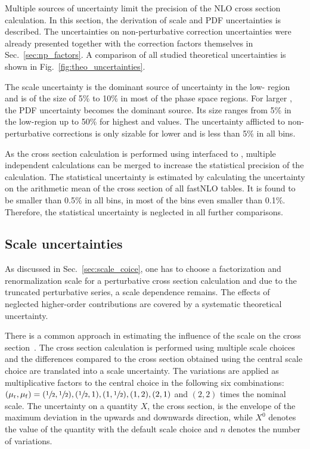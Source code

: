 Multiple sources of uncertainty limit the precision of the NLO cross section
calculation. In this section, the derivation of scale and PDF
uncertainties is described. The uncertainties
on non-perturbative correction uncertainties were already presented together
with the correction factors themselves in Sec.~\ref{sec:np_factors}. A
comparison of all studied theoretical uncertainties is shown in
Fig.~\ref{fig:theo_uncertainties}.

The scale uncertainty is the dominant source of uncertainty in the low-\pt
region and is of the size of 5\% to 10\% in most of the phase space regions. For
larger \ptavg, the PDF uncertainty becomes the dominant source. Its size ranges
from 5\% in the low-\ptavg region up to 50\% for highest \ptavg and \yboost
values. The uncertainty afflicted to non-perturbative corrections is only
sizable for lower \pt and is less than 5\% in all bins.

As the cross section calculation is performed using \fastNLO interfaced to
\NLOJETPP, multiple independent calculations can be merged to increase the
statistical precision of the calculation. The statistical uncertainty is
estimated by calculating the uncertainty on the arithmetic mean of the cross
section of all fastNLO tables. It is found to be smaller than 0.5\% in all bins,
in most of the bins even smaller than 0.1\%. Therefore, the statistical
uncertainty is neglected in all further comparisons.

\subsection{Scale uncertainties}
\label{sec:scale_uncertainties}

As discussed in Sec.~\ref{sec:scale_coice}, one has to choose a factorization
and renormalization scale for a perturbative cross section calculation and due to
the truncated perturbative series, a scale dependence remains. The effects of
neglected higher-order contributions are covered by a systematic theoretical
uncertainty.

There is a common approach in estimating the influence of the scale on the cross
section~\cite{Cacciari:2003fi}. The cross section calculation is performed using
multiple scale choices and the differences compared to the cross section
obtained using the central scale choice are translated into a scale uncertainty.
The variations are applied as multiplicative factors to the central choice in
the following six combinations: $(\mu_{\mathrm{r}}, \mu_{\mathrm{f}}) = (\sfrac{1}{2}, \sfrac{1}{2}),
(\sfrac{1}{2}, 1), (1, \sfrac{1}{2}), (1, 2), (2, 1)$ and $(2, 2)$ times the
nominal scale. The uncertainty on a quantity $X$, \eg the cross section, is the
envelope of the maximum deviation in the upwards and downwards direction, while
$X^0$ denotes the value of the quantity with the default scale choice and $n$
denotes the number of variations.


